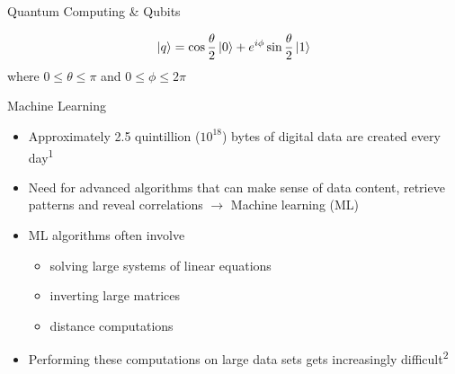 \documentclass[10pt]{beamer}
\begin{document}
{\begin{frame}[fragile]{Quantum Computing \& Qubits}
\begin{minipage}[c][][b]{.5\textwidth}
\begin{equation}
\label{equ: blochqubit}
\ket{q} = \cos\frac{\theta}{2} \ket{0} + e^{i \phi} \sin\frac{\theta}{2} \ket{1}
\end{equation}
where $0 \leq \theta \leq \pi$ and $0 \leq \phi \leq 2\pi$
\null
\par\xdef\tpd{\the\prevdepth}
\end{minipage}


\end{frame}
}

{
\begin{frame}[fragile]{Machine Learning}
   
\begin{itemize}
	\item Approximately 2.5 quintillion (${10}^{18}$) bytes of digital data are created every day\textsuperscript{1}
	\item Need for advanced algorithms that can make sense of data content, retrieve patterns and reveal correlations $\rightarrow$ Machine learning (ML) 
	\item ML algorithms often involve
	\begin{itemize}
	\item solving large systems of linear equations
	\item inverting large matrices
	\item distance computations
	\end{itemize}
	\item Performing these computations on large data
sets gets increasingly difficult\textsuperscript{2}


\end{itemize}

\end{frame}
}
\end{document}
